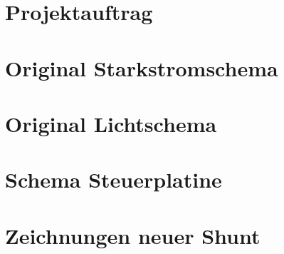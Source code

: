 \chapter{Projektauftrag}

%

%

\chapter{Original Starkstromschema}\label{schema_original}


\chapter{Original Lichtschema}\label{app:licht}


\chapter{Schema Steuerplatine}\label{Anh_Steuerplatine}



\chapter{Zeichnungen neuer Shunt}\label{app:2d}




